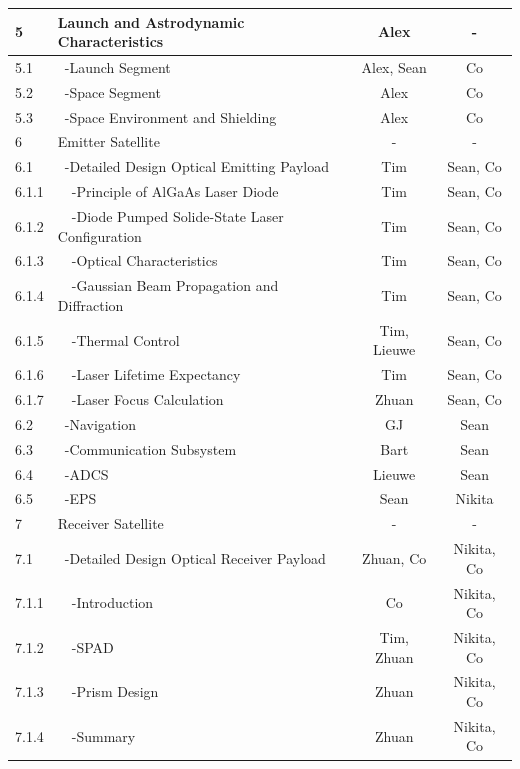\begin{center}
\begin{longtable}{|l|l|c|c|}
 5       & Launch and Astrodynamic Characteristics & Alex & -\\\hline
 5.1     & \ -Launch Segment                    & Alex, Sean & Co \\\hline
 5.2     & \ -Space Segment                     & Alex & Co \\\hline
 5.3     & \ -Space Environment and Shielding   & Alex & Co \\\hline\hline
 6       & Emitter Satellite                    & - & -\\\hline
 6.1     & \ -Detailed Design Optical Emitting Payload & Tim & Sean, Co \\\hline
 6.1.1   & \ \ -Principle of AlGaAs Laser Diode & Tim & Sean, Co \\\hline
 6.1.2   & \ \ -Diode Pumped Solide-State Laser Configuration & Tim & Sean, Co \\\hline
 6.1.3   & \ \ -Optical Characteristics        & Tim & Sean, Co\\\hline
 6.1.4   & \ \ -Gaussian Beam Propagation and Diffraction & Tim &  Sean, Co\\\hline  
 6.1.5   & \ \ -Thermal Control                & Tim, Lieuwe & Sean, Co\\\hline
 6.1.6   & \ \ -Laser Lifetime Expectancy     & Tim & Sean, Co\\\hline
 6.1.7   & \ \ -Laser Focus Calculation        & Zhuan & Sean, Co\\\hline
 6.2     & \ -Navigation                        & GJ & Sean \\\hline
 6.3     & \ -Communication Subsystem           & Bart & Sean\\\hline
 6.4     & \ -ADCS                              & Lieuwe & Sean\\\hline
 6.5     & \ -EPS                               & Sean & Nikita\\\hline\hline
 7       & Receiver Satellite                   & - & - \\\hline
 7.1     & \ -Detailed Design Optical Receiver Payload & Zhuan, Co & Nikita, Co\\\hline
 7.1.1   & \ \ -Introduction                           & Co & Nikita, Co\\\hline
 7.1.2   & \ \ -SPAD                           & Tim, Zhuan & Nikita, Co\\\hline
 7.1.3   & \ \ -Prism Design                   & Zhuan & Nikita, Co\\\hline
 7.1.4   & \ \ -Summary                        & Zhuan & Nikita, Co\\\hline

\end{longtable}
\end{center}
